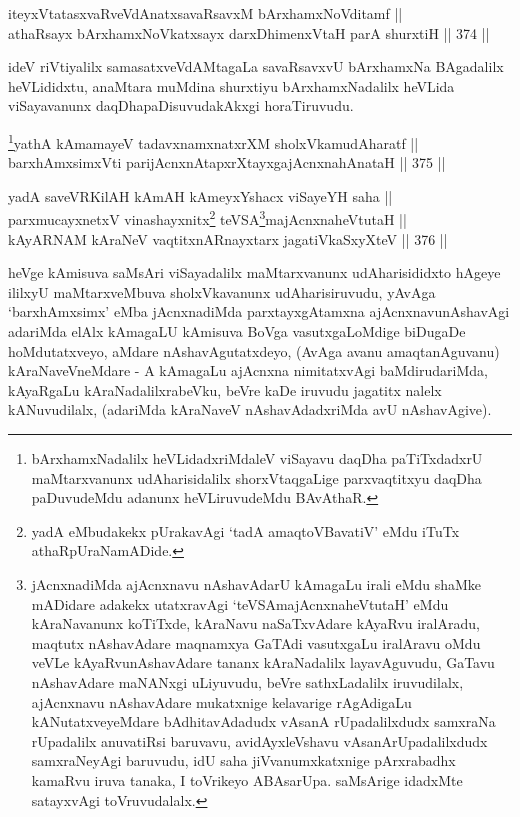 \begin{shl}
iteyxVtatasxvaRveVdAnatxsavaRsavxM bArxhamxNoVditamf || \\
athaRsayx bArxhamxNoVkatxsayx darxDhimenxV\s taH parA shurxtiH \hfill || 374 ||  
\end{shl}

\begin{artha}
ideV riVtiyalilx samasatxveVdAMtagaLa savaRsavxvU bArxhamxNa
BAgadalilx heVLididxtu, anaMtara muMdina shurxtiyu bArxhamxNadalilx
heVLida viSayavanunx daqDhapaDisuvudakAkxgi horaTiruvudu.
\end{artha}


\begin{shl}
\footnote{bArxhamxNadalilx heVLidadxriMdaleV viSayavu daqDha
paTiTxdadxrU maMtarxvanunx udAharisidalilx shorxVtaqgaLige
parxvaqtitxyu daqDha paDuvudeMdu adanunx heVLiruvudeMdu BAvAthaR.}yathA kAmamayeV tadavxnamxnatxrXM sholxVkamudAharatf || \\
barxhAmxsimxVti parijAcnxnAtapxrXtayxgajAcnxnahAnataH \hfill || 375 ||  
\end{shl}

\begin{shl}
yadA saveVR\s KilAH kAmAH kAmeyxYshacx viSayeYH saha || \\
parxmucayxnetxV vinashayxnitx\footnote{yadA eMbudakekx pUrakavAgi `tadA amaqtoVBavatiV' eMdu iTuTx
athaRpUraNamADide.} teVSA\footnote{jAcnxnadiMda ajAcnxnavu nAshavAdarU kAmagaLu irali eMdu
shaMke mADidare adakekx utatxravAgi `teVSAmajAcnxnaheVtutaH' eMdu kAraNavanunx
koTiTxde, kAraNavu naSaTxvAdare kAyaRvu iralAradu, maqtutx
nAshavAdare maqnamxya GaTAdi vasutxgaLu iralAravu oMdu veVLe
kAyaRvunAshavAdare tananx kAraNadalilx layavAguvudu, GaTavu
nAshavAdare maNANxgi uLiyuvudu, beVre sathxLadalilx iruvudilalx,
ajAcnxnavu nAshavAdare mukatxnige kelavarige rAgAdigaLu
kANutatxveyeMdare bAdhitavAdadudx vAsanA rUpadalilxdudx samxraNa
rUpadalilx anuvatiRsi baruvavu, avidAyxleVshavu vAsanArUpadalilxdudx
samxraNeyAgi baruvudu, idU saha jiVvanumxkatxnige pArxrabadhx
kamaRvu iruva tanaka, I toVrikeyo ABAsarUpa. saMsArige idadxMte
satayxvAgi toVruvudalalx.}majAcnxnaheVtutaH || \\
kAyARNAM kAraNeV vaqtitxnARnayxtarx jagatiVkaSxyXteV \hfill || 376 ||  
\end{shl}

\begin{artha}
heVge kAmisuva saMsAri viSayadalilx maMtarxvanunx udAharisididxto
hAgeye ililxyU maMtarxveMbuva sholxVkavanunx udAharisiruvudu, yAvAga
`barxhAmxsimx' eMba jAcnxnadiMda parxtayxgAtamxna ajAcnxnavunAshavAgi
adariMda elAlx kAmagaLU kAmisuva BoVga vasutxgaLoMdige biDugaDe
hoMdutatxveyo, aMdare nAshavAgutatxdeyo, (AvAga avanu amaqtanAguvanu)
kAraNaveVneMdare - A kAmagaLu ajAcnxna nimitatxvAgi baMdirudariMda,
kAyaRgaLu kAraNadalilxrabeVku, beVre kaDe iruvudu jagatitx nalelx
kANuvudilalx, (adariMda kAraNaveV nAshavAdadxriMda avU nAshavAgive).
\end{artha}

